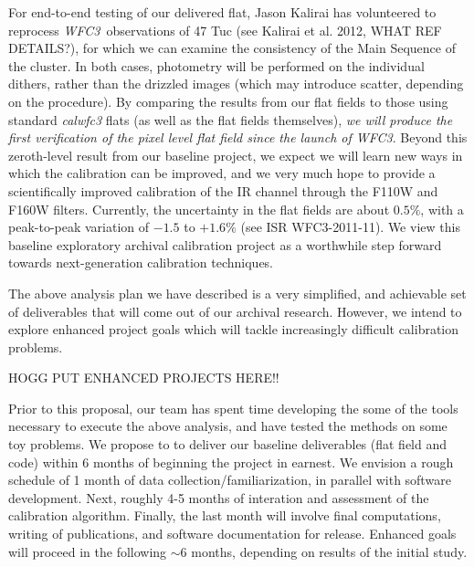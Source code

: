 \documentclass[12pt]{article}
\newcommand{\project}[1]{\textsl{#1}}
\newcommand{\WFC}{\project{WFC3}}
\begin{document}
For end-to-end testing of our delivered flat, Jason
Kalirai has volunteered to reprocess \WFC\ observations of 47 Tuc (see
Kalirai et al. 2012, WHAT REF DETAILS?), for which we can examine the
consistency of the Main Sequence of the cluster.  In both cases,
photometry will be performed on the individual dithers, rather than
the drizzled images (which may introduce scatter, depending on the
procedure).  By comparing the results from our flat fields to those
using standard \emph{calwfc3} flats (as well as the flat fields
themselves), \emph{we will produce the first verification of the pixel
  level flat field since the launch of \WFC}.  Beyond this zeroth-level
result from our baseline project, we expect we will learn new ways in
which the calibration can be improved, and we very much hope to provide a scientifically
improved calibration of the IR channel through the F110W and F160W filters.  Currently, the
uncertainty in the flat fields are about $0.5\%$, with a peak-to-peak
variation of $-1.5$ to $+1.6\%$ (see ISR WFC3-2011-11).  We view this
baseline exploratory archival calibration project as a worthwhile step forward
towards next-generation calibration techniques.

The above analysis plan we have described is a very simplified, and
achievable set of deliverables that will come out of our archival
research.  However, we intend to explore enhanced project goals which
will tackle increasingly difficult calibration problems. 

HOGG PUT ENHANCED PROJECTS HERE!!

%
%
\budgetnarrative       %

Prior to this proposal, our team has spent time developing the some of
the tools necessary to execute the above analysis, and have tested the
methods on some toy problems.  We propose to to deliver our baseline
deliverables (flat field and code) within 6 months of beginning the
project in earnest.  We envision a rough schedule of 1 month of data
collection/familiarization, in parallel with software development.
Next, roughly 4-5 months of interation and assessment of the
calibration algorithm.  Finally, the last month will involve final
computations, writing of publications, and software documentation for
release. Enhanced goals will proceed in the following $\sim6$ months,
depending on results of the initial study.
\end{document}
